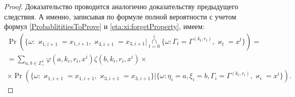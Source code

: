 \begin{proof}
Доказательство проводится аналогично доказательству предыдущего следствия. А именно,  записывая по формуле полной вероятности с учетом формул \eqref{ProbablititiesToProve} и \eqref{eta:xi:forgetProperty},  имеем:
\begin{multline*}
\Pr (\{ \omega \colon \varkappa_{1, i+1} = x_{1, i+1},  \varkappa_{3, i+1} = x_{3, i+1} |\mathop{\cap}\limits_{t=0}^{i}\{\omega\colon \Gamma_t=\Gamma^{(k_t, r_t)},  \varkappa_t=x^t\}) =\\
=\sum_{a, b\in \mathbb{Z}_+^4} \varphi(a, k_i, r_i, x^i)\zeta(b, k_i, r_i, x^i) \times\\
\times \Pr (\{ \omega \colon \varkappa_{1, i+1} = x_{1, i+1},  \varkappa_{3, i+1} = x_{3, i+1}\} |\{\omega\colon \eta_i=a,  \xi_i=b,  \Gamma_i=\Gamma^{(k_i, r_i)},  \varkappa_i=x^i\}).
\end{multline*}



\end{proof}
